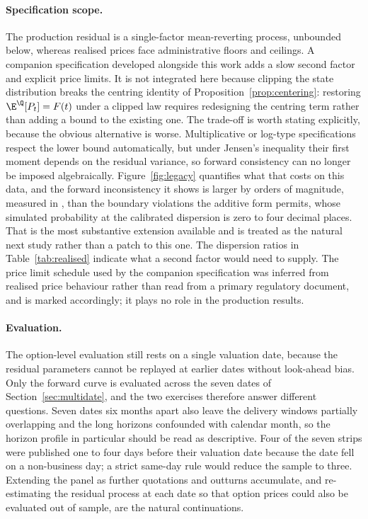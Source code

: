 \paragraph{Specification scope.} The production residual is a single-factor
mean-reverting process, unbounded below, whereas realised prices face
administrative floors and ceilings. A companion specification developed alongside
this work adds a slow second factor and explicit price limits. It is not
integrated here because clipping the state distribution breaks the centring
identity of Proposition~\ref{prop:centering}: restoring $\E^{\Q}[P_t]=F(t)$ under
a clipped law requires redesigning the centring term rather than adding a bound
to the existing one. The trade-off is worth stating explicitly, because the
obvious alternative is worse. Multiplicative or log-type specifications respect
the lower bound automatically, but under Jensen's inequality their first moment
depends on the residual variance, so forward consistency can no longer be
imposed algebraically. Figure~\ref{fig:legacy} quantifies what that costs on
this data, and the forward inconsistency it shows is larger by orders of
magnitude, measured in \TRY, than the boundary violations the additive form
permits, whose simulated probability at the calibrated dispersion is zero to
four decimal places. That is the most substantive extension available and is
treated as the natural next study rather than a patch to this one. The dispersion
ratios in Table~\ref{tab:realised} indicate what a second factor would need to
supply. The price limit schedule used by the companion specification was inferred
from realised price behaviour rather than read from a primary regulatory
document, and is marked accordingly; it plays no role in the production results.

\paragraph{Evaluation.} The option-level evaluation still rests on a single
valuation date, because the residual parameters cannot be replayed at earlier
dates without look-ahead bias. Only the forward curve is evaluated across the
seven dates of Section~\ref{sec:multidate}, and the two exercises therefore
answer different questions. Seven dates six months apart also leave the delivery
windows partially overlapping and the long horizons confounded with calendar
month, so the horizon profile in particular should be read as descriptive.
Four of the seven strips were published one to four days before their valuation
date because the date fell on a non-business day; a strict same-day rule would
reduce the sample to three. Extending the panel as further quotations and
outturns accumulate, and re-estimating the residual process at each date so that
option prices could also be evaluated out of sample, are the natural
continuations.
